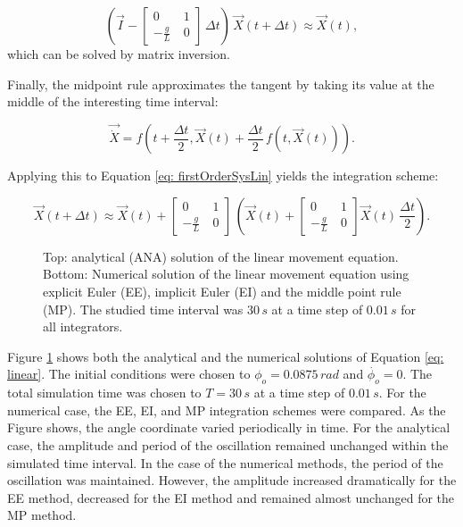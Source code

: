 \documentclass[12pt,bibstyle=none,pagenumberinfooter]{ifmdocument}
\begin{document}
\begin{equation}
    \left(\vec{I} - \begin{bmatrix}
        0 & 1 \\ -\frac{g}{L}\ & 0 
        \end{bmatrix}\,\Delta t \right)\,\Vec{X}(t+\Delta t) \approx \Vec{X}(t),
\end{equation}
which can be solved by matrix inversion.

Finally, the midpoint rule approximates the tangent by taking its value at the middle of the interesting time interval:

\begin{equation}
    \Vec{\Dot{X}} = f\left( t+\frac{\Delta t}{2}, \Vec{X}(t) + \frac{\Delta t}{2}\,f\left(t, \Vec{X}(t)\right) \right).
\end{equation}

Applying this to Equation \ref{eq: firstOrderSysLin} yields the integration scheme:

\begin{equation}
    \Vec{X}(t+\Delta t) \approx \vec{X}(t) + \begin{bmatrix}
        0 & 1 \\ -\frac{g}{L}\ & 0 
        \end{bmatrix}\,\left(\Vec{X}(t) + \begin{bmatrix}
        0 & 1 \\ -\frac{g}{L}\ & 0 
        \end{bmatrix} \Vec{X}(t)\, \frac{\Delta t}{2} \right).
\end{equation}


\begin{figure}[h]
    \centering
    
    \caption{Top: analytical (ANA) solution of the linear movement equation. Bottom: Numerical solution of the linear movement equation using explicit Euler (EE), implicit Euler (EI) and the middle point rule (MP). The studied time interval was $30\,s$ at a time step of $0.01\,s$ for all integrators.}
    \label{fig:LinSolutions}
\end{figure}

Figure \ref{fig:LinSolutions} shows both the analytical and the numerical solutions of Equation \ref{eq: linear}. The initial conditions were chosen to $\phi_o = 0.0875\,rad$ and $\Dot{\phi_o}= 0$. The total simulation time was chosen to $T = 30\,s$ at a time step of $0.01\,s$. For the numerical case, the EE, EI, and MP integration schemes were compared. As the Figure shows, the angle coordinate varied periodically in time. For the analytical case, the amplitude and period of the oscillation remained unchanged within the simulated time interval. In the case of the numerical methods, the period of the oscillation was maintained. However, the amplitude increased dramatically for the EE method, decreased for the EI method and remained almost unchanged for the MP method. 
\end{document}
